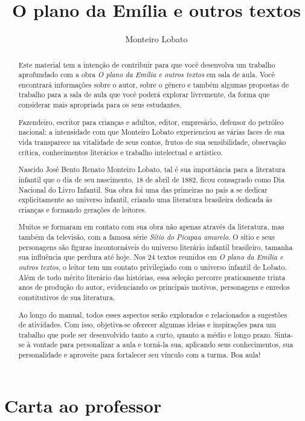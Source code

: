 \documentclass[11pt]{extarticle}
\newcommand{\AutorLivro}{Monteiro Lobato}
\newcommand{\TituloLivro}{O plano da Emília e outros textos}
\newcommand{\colaborador}{Paulo Pompermaier}
\begin{document}
\title{\TituloLivro}
\author{\AutorLivro}
\def\authornotes{\colaborador}

\date{}
\maketitle

\tableofcontents

\section{Carta ao professor}

\begin{abstract}
Este material tem a intenção de contribuir para que você desenvolva um trabalho aprofundado com a obra \textit{O plano da Emília e outros textos} em sala de aula.
Você encontrará informações sobre o autor, sobre o gênero e também 
algumas propostas de trabalho para a sala de aula que você poderá explorar livremente, 
da forma que considerar mais apropriada para os seus estudantes.

Fazendeiro, escritor para crianças e adultos, editor, empresário,
defensor do petróleo nacional: a intensidade com que Monteiro Lobato
experienciou as várias faces de sua vida transparece na vitalidade de
seus contos, frutos de sua sensibilidade, observação crítica,
conhecimentos literários e trabalho intelectual e artístico.

Nascido José Bento Renato Monteiro Lobato, tal é sua importância para a literatura infantil que o dia de seu nascimento, 18 de abril de 1882, ficou consagrado como Dia Nacional do Livro Infantil. Sua obra foi uma das primeiras no país a se dedicar explicitamente ao universo infantil, criando uma literatura brasileira dedicada às crianças e formando gerações de leitores.

Muitos se formaram em contato com sua obra não apenas através da literatura, mas também da televisão, com a famosa série \textit{Sítio do Picapau amarelo}. O sítio e seus personagens são figuras incontornáveis do universo literário infantil brasileiro, tamanha sua influência que perdura até hoje. Nos 24 textos reunidos em \textit{O plano da Emília e outros textos}, o leitor tem um contato privilegiado com o universo infantil de Lobato.
Além de todo mérito literário das histórias, essa seleção percorre praticamente trinta anos de produção do autor, evidenciando os principais motivos, personagens e enredos constitutivos de sua literatura.

Ao longo do manual, todos esses aspectos serão explorados e relacionados a sugestões de atividades. Com isso, objetiva-se oferecer algumas ideias e inspirações para um trabalho que pode ser desenvolvido tanto a curto, quanto a médio e longo prazo. Sinta-se à vontade para personalizar a aula e torná-la sua, aplicando seus conhecimentos, sua 
personalidade e aproveite para fortalecer seu vínculo com a turma.
Boa aula!
\end{abstract}
\end{document}
